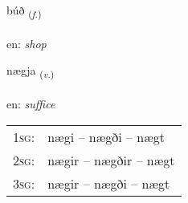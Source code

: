 \documentclass[frontgrid, backgrid]{flacards}\usepackage[]{graphicx}\usepackage[]{color}
\begin{document}
{búð \small{\textsubscript{(\textit{f.})}} \\[1ex] %
\textphonetic{[puːð]} \\
en: \emph{shop} \\  [2ex]
\renewcommand*{\arraystretch}{0.8}
}

\renewcommand{\flhead}{\vskip5pt \fboxsep=0pt {\small\bfseries\footnotesize Sagnorð | Verb}}
\renewcommand{\fcfoot}{\vskip5pt \fboxsep=0pt \hspace{2pt}{\small\bfseries\footnotesize 2K}}

\renewcommand{\blhead}{\vskip5pt {\small\bfseries\footnotesize Sagnorð | Verb }}
\renewcommand{\bcfoot}{\vskip5pt \hspace{2pt}{\small\bfseries\footnotesize 2K}}


{nægja \small{\textsubscript{(\textit{v.})}} \\[1ex] %
\textphonetic{[naiːja]} \\
en: \emph{suffice} \\  [2ex]
\renewcommand*{\arraystretch}{0.8}
\begin{tabular}{p{1cm}l}
\textsc{1sg}: & nægi -- nægði -- nægt \\ 
\textsc{2sg}: & nægir -- nægðir -- nægt \\ 
\textsc{3sg}: & nægir -- nægði -- nægt \\ 
\end{tabular}
}

\renewcommand{\flhead}{\vskip5pt \fboxsep=0pt {\small\bfseries\footnotesize Nafnorð | Noun}}
\renewcommand{\fcfoot}{\vskip5pt \fboxsep=0pt \hspace{2pt}{\small\bfseries\footnotesize 2K}}

\renewcommand{\blhead}{\vskip5pt {\small\bfseries\footnotesize Nafnorð | Noun }}
\renewcommand{\bcfoot}{\vskip5pt \hspace{2pt}{\small\bfseries\footnotesize 2K}}
\end{document}
